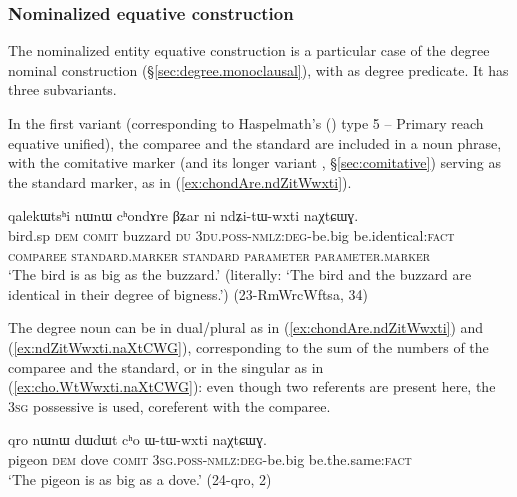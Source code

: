 \subsubsection{Nominalized equative construction} \label{sec:nmlz.equative}
The nominalized entity equative construction is a particular case of the degree nominal construction (§\ref{sec:degree.monoclausal}), with  as degree predicate. It has three subvariants.

In the first variant (corresponding to Haspelmath's (\citeyear{haspelmath17equative}) type 5 -- Primary reach equative unified), the comparee and the standard are included in a noun phrase, with the comitative marker  (and its longer variant , §\ref{sec:comitative}) serving as the standard marker, as in (\ref{ex:chondAre.ndZitWwxti}).

\begin{exe}
\ex \label{ex:chondAre.ndZitWwxti}
\glll qalekɯtsʰi nɯnɯ cʰondɤre βʑar ni ndʑi-tɯ-wxti naχtɕɯɣ.\\
bird.sp \textsc{dem} \textsc{comit} buzzard \textsc{du} \textsc{3du}.\textsc{poss}-\textsc{nmlz}:\textsc{deg}-be.big be.identical:\textsc{fact} \\
{\textsc{comparee}} { } \textsc{standard}.\textsc{marker} {\textsc{standard}} { } \textsc{parameter} \textsc{parameter}.\textsc{marker} \\
\glt `The  bird is as big as the buzzard.' (literally: `The  bird and the buzzard are identical in their degree of bigness.')  (23-RmWrcWftsa, 34)
\end{exe}

The degree noun can be in dual/plural as in (\ref{ex:chondAre.ndZitWwxti}) and (\ref{ex:ndZitWwxti.naXtCWG}), corresponding to the sum of the numbers of the comparee and the standard, or in the  singular as in (\ref{ex:cho.WtWwxti.naXtCWG}): even though two referents are present here, the \textsc{3sg} possessive  is used, coreferent with the comparee. 

\begin{exe} %
\ex \label{ex:cho.WtWwxti.naXtCWG}
\gll  qro nɯnɯ dɯdɯt cʰo ɯ-tɯ-wxti naχtɕɯɣ. \\
pigeon \textsc{dem} dove \textsc{comit} \textsc{3sg}.\textsc{poss}-\textsc{nmlz}:\textsc{deg}-be.big be.the.same:\textsc{fact} \\
\glt `The pigeon is as big as a dove.' (24-qro, 2)
\end{exe}

